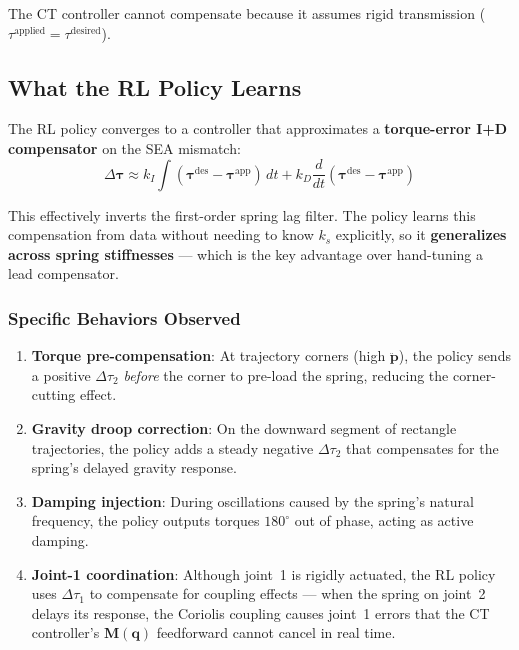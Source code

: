 \documentclass[11pt, a4paper]{article}
\newcommand{\bq}{\bm{q}}
\newcommand{\btau}{\bm{\tau}}
\newcommand{\bM}{\bm{M}}
\begin{document}
The CT controller cannot compensate because it assumes rigid transmission
($\tau^{\text{applied}} = \tau^{\text{desired}}$).

\subsection{What the RL Policy Learns}

The RL policy converges to a controller that approximates a
\textbf{torque-error I+D compensator} on the SEA mismatch:
\begin{equation}
  \boxed{
  \Delta\btau \approx k_I \int (\btau^{\text{des}} - \btau^{\text{app}})\,dt
  + k_D \frac{d}{dt}(\btau^{\text{des}} - \btau^{\text{app}})
  }
  \label{eq:rl_learned}
\end{equation}

This effectively inverts the first-order spring lag filter.  The policy
learns this compensation from data without needing to know $k_s$ explicitly,
so it \textbf{generalizes across spring stiffnesses} --- which is the key
advantage over hand-tuning a lead compensator.

\subsubsection{Specific Behaviors Observed}

\begin{enumerate}
  \item \textbf{Torque pre-compensation}: At trajectory corners (high
        $\ddot{\bm{p}}$), the policy sends a positive $\Delta\tau_2$
        \emph{before} the corner to pre-load the spring, reducing the
        corner-cutting effect.

  \item \textbf{Gravity droop correction}: On the downward segment of
        rectangle trajectories, the policy adds a steady negative
        $\Delta\tau_2$ that compensates for the spring's delayed
        gravity response.

  \item \textbf{Damping injection}: During oscillations caused by the
        spring's natural frequency, the policy outputs torques
        $180^\circ$ out of phase, acting as active damping.

  \item \textbf{Joint-1 coordination}: Although joint~1 is rigidly
        actuated, the RL policy uses $\Delta\tau_1$ to compensate
        for coupling effects --- when the spring on joint~2 delays
        its response, the Coriolis coupling causes joint~1 errors
        that the CT controller's $\bM(\bq)$ feedforward cannot
        cancel in real time.
\end{enumerate}
\end{document}
